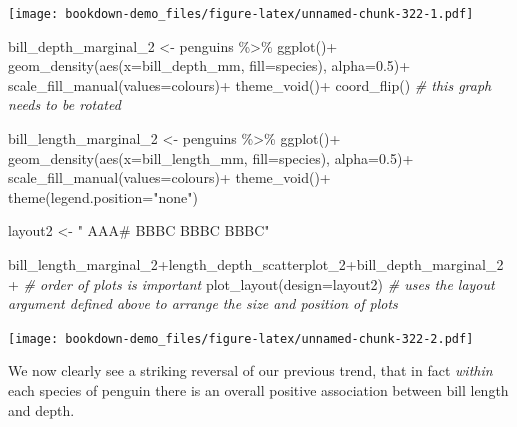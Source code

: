\documentclass[
]{book}
\newenvironment{Shaded}{\begin{snugshade}}{\end{snugshade}}
\newcommand{\AttributeTok}[1]{\textcolor[rgb]{0.77,0.63,0.00}{#1}}
\newcommand{\CommentTok}[1]{\textcolor[rgb]{0.56,0.35,0.01}{\textit{#1}}}
\newcommand{\FloatTok}[1]{\textcolor[rgb]{0.00,0.00,0.81}{#1}}
\newcommand{\FunctionTok}[1]{\textcolor[rgb]{0.00,0.00,0.00}{#1}}
\newcommand{\NormalTok}[1]{#1}
\newcommand{\OtherTok}[1]{\textcolor[rgb]{0.56,0.35,0.01}{#1}}
\newcommand{\SpecialCharTok}[1]{\textcolor[rgb]{0.00,0.00,0.00}{#1}}
\newcommand{\StringTok}[1]{\textcolor[rgb]{0.31,0.60,0.02}{#1}}
\begin{document}
\texttt{[image: bookdown-demo\_files/figure-latex/unnamed-chunk-322-1.pdf]}

\begin{Shaded}
\begin{Highlighting}[]
\NormalTok{bill\_depth\_marginal\_2 }\OtherTok{\textless{}{-}}\NormalTok{ penguins }\SpecialCharTok{\%\textgreater{}\%} 
  \FunctionTok{ggplot}\NormalTok{()}\SpecialCharTok{+}
  \FunctionTok{geom\_density}\NormalTok{(}\FunctionTok{aes}\NormalTok{(}\AttributeTok{x=}\NormalTok{bill\_depth\_mm,}
                   \AttributeTok{fill=}\NormalTok{species),}
               \AttributeTok{alpha=}\FloatTok{0.5}\NormalTok{)}\SpecialCharTok{+}
  \FunctionTok{scale\_fill\_manual}\NormalTok{(}\AttributeTok{values=}\NormalTok{colours)}\SpecialCharTok{+}
  \FunctionTok{theme\_void}\NormalTok{()}\SpecialCharTok{+}
  \FunctionTok{coord\_flip}\NormalTok{() }\CommentTok{\# this graph needs to be rotated}

\NormalTok{bill\_length\_marginal\_2 }\OtherTok{\textless{}{-}}\NormalTok{ penguins }\SpecialCharTok{\%\textgreater{}\%} 
  \FunctionTok{ggplot}\NormalTok{()}\SpecialCharTok{+}
  \FunctionTok{geom\_density}\NormalTok{(}\FunctionTok{aes}\NormalTok{(}\AttributeTok{x=}\NormalTok{bill\_length\_mm,}
                   \AttributeTok{fill=}\NormalTok{species),}
               \AttributeTok{alpha=}\FloatTok{0.5}\NormalTok{)}\SpecialCharTok{+}
  \FunctionTok{scale\_fill\_manual}\NormalTok{(}\AttributeTok{values=}\NormalTok{colours)}\SpecialCharTok{+}
  \FunctionTok{theme\_void}\NormalTok{()}\SpecialCharTok{+}
  \FunctionTok{theme}\NormalTok{(}\AttributeTok{legend.position=}\StringTok{"none"}\NormalTok{)}

\NormalTok{layout2 }\OtherTok{\textless{}{-}} \StringTok{"}
\StringTok{AAA\#}
\StringTok{BBBC}
\StringTok{BBBC}
\StringTok{BBBC"}

\NormalTok{bill\_length\_marginal\_2}\SpecialCharTok{+}\NormalTok{length\_depth\_scatterplot\_2}\SpecialCharTok{+}\NormalTok{bill\_depth\_marginal\_2}\SpecialCharTok{+} \CommentTok{\# order of plots is important}
  \FunctionTok{plot\_layout}\NormalTok{(}\AttributeTok{design=}\NormalTok{layout2) }\CommentTok{\# uses the layout argument defined above to arrange the size and position of plots}
\end{Highlighting}
\end{Shaded}

\texttt{[image: bookdown-demo\_files/figure-latex/unnamed-chunk-322-2.pdf]}

We now clearly see a striking reversal of our previous trend, that in fact \emph{within} each species of penguin there is an overall positive association between bill length and depth.
\end{document}
